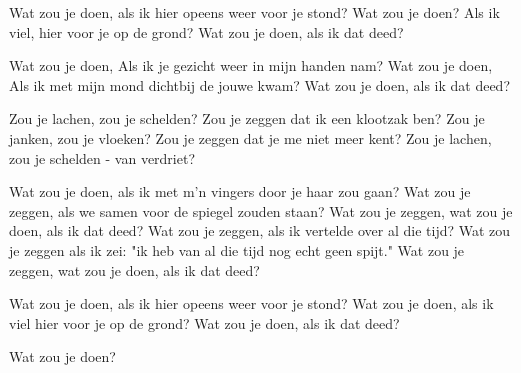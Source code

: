 \begin{verse*}
Wat zou je doen, als ik hier opeens weer voor je stond?
Wat zou je doen?
Als ik viel, hier voor je op de grond?
Wat zou je doen, als ik dat deed?
\end{verse*}

\begin{verse*}
Wat zou je doen,
Als ik je gezicht weer in mijn handen nam?
Wat zou je doen,
Als ik met mijn mond dichtbij de jouwe kwam?
Wat zou je doen, als ik dat deed?
\end{verse*}

\begin{chorus}
Zou je lachen, zou je schelden?
Zou je zeggen dat ik een klootzak ben?
Zou je janken, zou je vloeken?
Zou je zeggen dat je me niet meer kent?
Zou je lachen, zou je schelden - van verdriet?
\end{chorus}

\begin{verse*}
Wat zou je doen, als ik met m'n vingers door je haar zou gaan?
Wat zou je zeggen, als we samen voor de spiegel zouden staan?
Wat zou je zeggen, wat zou je doen, als ik dat deed?
Wat zou je zeggen, als ik vertelde over al die tijd?
Wat zou je zeggen als ik zei: "ik heb van al die tijd nog echt geen spijt."
Wat zou je zeggen, wat zou je doen, als ik dat deed?
\end{verse*}

\thechorus

\begin{verse*}
Wat zou je doen, als ik hier opeens weer voor je stond?
Wat zou je doen, als ik viel hier voor je op de grond?
Wat zou je doen, als ik dat deed?
\end{verse*}

\thechorus

\thechorus

\begin{verse*}
Wat zou je doen?
\end{verse*}
